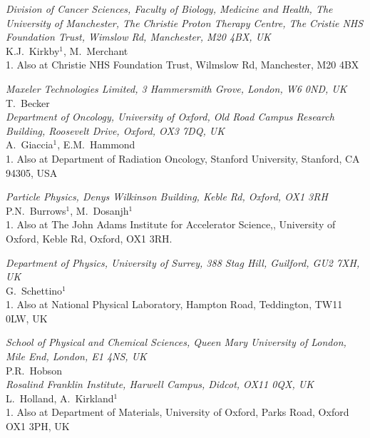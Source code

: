 \noindent \textit{Division of Cancer Sciences, Faculty of Biology, Medicine and Health, The University of Manchester, The Christie Proton Therapy Centre, The Cristie NHS Foundation Trust, Wimslow Rd, Manchester, M20 4BX, UK} \\
K.J.~Kirkby$^{1}$, M.~Merchant \\
{\footnotesize
  1. Also at Christie NHS Foundation Trust, Wilmslow Rd, Manchester, M20 4BX \\
}
 
\noindent \textit{Maxeler Technologies Limited, 3 Hammersmith Grove, London, W6 0ND, UK} \\
T.~Becker \\
 
\noindent \textit{Department of Oncology, University of Oxford, Old Road Campus Research Building, Roosevelt Drive, Oxford, OX3 7DQ, UK} \\
A.~Giaccia$^{1}$, E.M.~Hammond \\
{\footnotesize
  1. Also at Department of Radiation Oncology, Stanford University, Stanford, CA 94305, USA \\
}
 
\noindent \textit{Particle Physics, Denys Wilkinson Building, Keble Rd, Oxford, OX1 3RH} \\
P.N.~Burrows$^{1}$, M.~Dosanjh$^{1}$ \\
{\footnotesize
  1. Also at The John Adams Institute for Accelerator Science,, University of Oxford, Keble Rd, Oxford, OX1 3RH. \\
}
 
\noindent \textit{Department of Physics, University of Surrey, 388 Stag Hill, Guilford, GU2 7XH, UK} \\
G.~Schettino$^{1}$ \\
{\footnotesize
  1. Also at National Physical Laboratory, Hampton Road, Teddington, TW11 0LW, UK \\
}
 
\noindent \textit{School of Physical and Chemical Sciences, Queen Mary University of London, Mile End, London, E1 4NS, UK} \\
P.R.~Hobson \\
 
\noindent \textit{Rosalind Franklin Institute, Harwell Campus, Didcot, OX11 0QX, UK} \\
L.~Holland, A.~Kirkland$^{1}$ \\
{\footnotesize
  1. Also at Department of Materials, University of Oxford, Parks Road, Oxford OX1 3PH, UK \\
}
 
